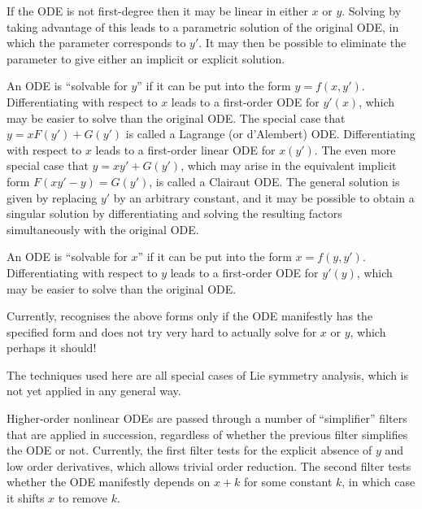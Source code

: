 If the ODE is not first-degree then it may be linear in either $x$ or
$y$.  Solving by taking advantage of this leads to a parametric
solution of the original ODE, in which the parameter corresponds to
$y'$.  It may then be possible to eliminate the parameter to give
either an implicit or explicit solution.

An ODE is ``solvable for $y$'' if it can be put into the form $y =
f(x,y')$.  Differentiating with respect to $x$ leads to a first-order
ODE for $y'(x)$, which may be easier to solve than the original ODE.
The special case that $y = xF(y') + G(y')$ is called a Lagrange (or
d'Alembert) ODE\@.  Differentiating with respect to $x$ leads to a
first-order linear ODE for $x(y')$.  The even more special case that
$y = x y' + G(y')$, which may arise in the equivalent implicit form
$F(xy'-y) = G(y')$, is called a Clairaut ODE\@.  The general solution is
given by replacing $y'$ by an arbitrary constant, and it may be
possible to obtain a singular solution by differentiating and solving
the resulting factors simultaneously with the original ODE.

An ODE is ``solvable for $x$'' if it can be put into the form $x =
f(y,y')$.  Differentiating with respect to $y$ leads to a first-order
ODE for $y'(y)$, which may be easier to solve than the original ODE.

Currently,  recognises the above forms only if the ODE
manifestly has the specified form and does not try very hard to
actually solve for $x$ or $y$, which perhaps it should!



The techniques used here are all special cases of Lie symmetry
analysis, which is not yet applied in any general way.

Higher-order nonlinear ODEs are passed through a number of
``simplifier'' filters that are applied in succession, regardless of
whether the previous filter simplifies the ODE or not.  Currently, the
first filter tests for the explicit absence of $y$ and low order
derivatives, which allows trivial order reduction.  The second filter
tests whether the ODE manifestly depends on $x+k$ for some constant
$k$, in which case it shifts $x$ to remove $k$.

